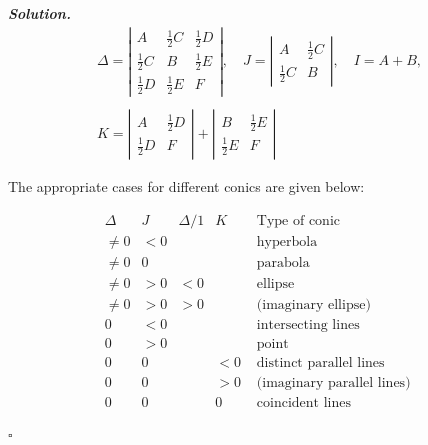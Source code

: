 \documentclass[8pt]{article}
\newenvironment{solution}[1][\it{Solution}]{\textbf{#1. } }{$\square$}
\begin{document}
\begin{solution}
$$
\begin{array}{l}
\Delta=\left|\begin{array}{ccc}
A & \frac{1}{2} C & \frac{1}{2} D \\
\frac{1}{2} C & B & \frac{1}{2} E \\
\frac{1}{2} D & \frac{1}{2} E & F
\end{array}\right|, \quad J=\left|\begin{array}{cc}
A & \frac{1}{2} C \\
\frac{1}{2} C & B
\end{array}\right|, \quad I=A+B, \\\\
K=\left|\begin{array}{cc}
A & \frac{1}{2} D \\
\frac{1}{2} D & F
\end{array}\right|+\left|\begin{array}{cc}
B & \frac{1}{2} E \\
\frac{1}{2} E & F
\end{array}\right|
\end{array}
$$

The appropriate cases for different conics are given below:

$$
\begin{array}{ccccl}
\Delta & J & \Delta / 1 & K & \text { Type of conic } \\
\hline \neq 0 & <0 & & & \text { hyperbola } \\
\neq 0 & 0 & & & \text { parabola } \\
\neq 0 & >0 & <0 & & \text { ellipse } \\
\neq 0 & >0 & >0 & & \text { (imaginary ellipse) } \\
0 & <0 & & & \text { intersecting lines } \\
0 & >0 & & & \text { point } \\
0 & 0 & & <0 & \text { distinct parallel lines } \\
0 & 0 & & >0 & \text { (imaginary parallel lines) } \\
0 & 0 & & 0 & \text { coincident lines }
\end{array}
$$


\end{solution}
\end{document}
